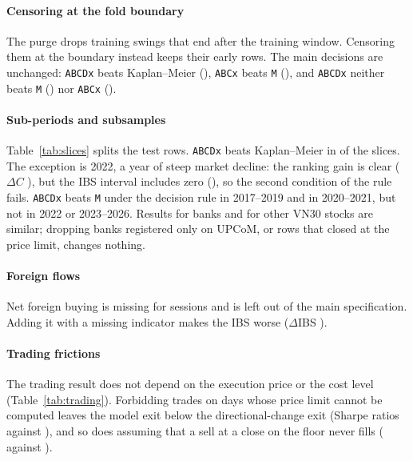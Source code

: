 \paragraph{Censoring at the fold boundary} The purge drops training swings that end after the
training window. Censoring them at the boundary instead keeps their early rows. The main decisions
are unchanged: \texttt{ABCDx} beats Kaplan--Meier (\BoundaryABCDxKm), \texttt{ABCx} beats
\texttt{M} (\BoundaryABCxM), and \texttt{ABCDx} neither beats \texttt{M} (\BoundaryABCDxM) nor
\texttt{ABCx} (\BoundaryABCDxABCx).

\paragraph{Sub-periods and subsamples} Table~\ref{tab:slices} splits the test rows. \texttt{ABCDx}
beats Kaplan--Meier in \SlicesBeatKM{} of the \SlicesCount{} slices. The exception is 2022, a year of
steep market decline: the ranking gain is clear ($\Delta C$ \SliceTwoZeroTwoTwoDCKm), but the IBS
interval includes zero (\SliceTwoZeroTwoTwoDIBSKm), so the second condition of the rule fails.
\texttt{ABCDx} beats \texttt{M} under the decision rule in 2017--2019 and in 2020--2021, but not
in 2022 or 2023--2026. Results for banks and for other VN30 stocks are similar; dropping banks
registered only on UPCoM, or rows that closed at the price limit, changes nothing.

\begin{table}[!htbp]
\centering
\caption{Sub-periods and subsamples of the test rows, main specification. ``Beats'' applies the
decision rule of the primary tests to \texttt{ABCDx} against \texttt{M} and against Kaplan--Meier
(KM) within the slice.}\label{tab:slices}
\footnotesize
\setlength{\tabcolsep}{3.5pt}
\end{table}

\paragraph{Foreign flows} Net foreign buying is missing for \ForeignMissingSessions{} sessions and
is left out of the main specification. Adding it with a missing indicator makes the IBS worse
($\Delta$IBS \DIBSABCDxFfABCDx).

\paragraph{Trading frictions} The trading result does not depend on the execution price or the
cost level (Table~\ref{tab:trading}). Forbidding trades on days whose price limit cannot be
computed leaves the model exit below the directional-change exit (Sharpe ratios \BtOpenSharpeModelSkip{}
against \BtOpenSharpeDcSkip), and so does assuming that a sell at a close on the floor never fills
(\BtOpenSharpeModelFloor{} against \BtOpenSharpeDcFloor).
